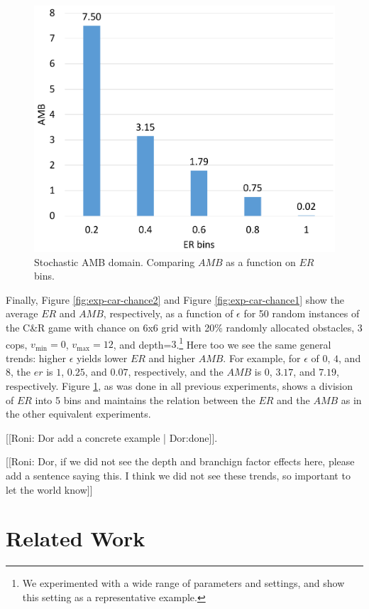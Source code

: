 \documentclass[letterpaper]{article} %
\newcommand{\vmax}{v_{\text{max}}}
\newcommand{\vmin}{v_{\text{min}}}
\newcommand{\amb}{\mathit{AMB}}
\newcommand{\er}{\mathit{ER}}
\begin{document}
\begin{figure}
	\centering
	\includegraphics[width=0.8\columnwidth]{Figures/Cops_And_Robber_BAB_depth_chance3_bins.pdf}
    \caption{Stochastic AMB domain. Comparing $\amb$ as a function on $\er$ bins.}
	\label{fig:exp-car-chance3}
\end{figure}


Finally, Figure \ref{fig:exp-car-chance2} and Figure \ref{fig:exp-car-chance1} show the average $\er$ and $\amb$, respectively, as a function of $\epsilon$ for 50 random instances of the C\&R game with chance on 6x6 grid with 20\% randomly allocated obstacles, 3 cops, $\vmin=0$, $\vmax=12$, and depth=$3$.\footnote{We experimented with a wide range of parameters and settings, and show this setting as a representative example.} Here too we see the same general trends: higher $\epsilon$ yields lower $\er$ and higher $\amb$. For example, for $\epsilon$ of $0$, $4$, and $8$, the $er$ is $1$, $0.25$, and $0.07$, respectively, and the $\amb$ is $0$, $3.17$, and $7.19$, respectively.
Figure \ref{fig:exp-car-chance3}, as was done in all previous experiments, shows a division of $\er$ into 5 bins and maintains the relation between the $\er$ and the $\amb$  as in the other equivalent experiments.

[[Roni: Dor add a concrete example | Dor:done]].

[[Roni: Dor, if we did not see the depth and branchign factor effects here, please add a sentence saying this. I think we did not see these trends, so important to let the world know]]

\section{Related Work}
\end{document}
